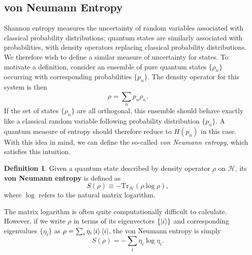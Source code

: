 \documentclass[12pt,a4paper]{report}
\numberwithin{equation}{section}
\newcommand{\ketbra}[2]{\ket{#1}\bra{#2}}
\newcommand{\ketbras}[1]{\ketbra{#1}{#1}}
\newcommand{\tr}{\text{Tr}}
\theoremstyle{definition}
\newtheorem{definition}{Definition}[section]
\theoremstyle{theorem}
\theoremstyle{theorem}
\theoremstyle{example}
\theoremstyle{definition}
\begin{document}
\subsection{von Neumann Entropy}
Shannon entropy measures the uncertainty of random variables associated with classical probability distributions; quantum states are similarly associated with probabilities, with density operators replacing classical probability distributions. We therefore wish to define a similar measure of uncertainty for states. To motivate a definition, consider an ensemble of pure quantum states $\{\rho_{n}\}$ occurring with corresponding probabilities $\{p_n\}$. The density operator for this system is then
\begin{equation}
	\rho=\sum_{n}p_{n}\rho_{n}.
\end{equation}
If the set of states $\{\rho_{n}\}$ are all orthogonal, this ensemble should behave exactly like a classical random variable following probability distribution $\{p_{n}\}$. A quantum measure of entropy should therefore reduce to $H(p_{n})$ in this case. With this idea in mind, we can define the so-called \textit{von Neumann entropy}, which satisfies this intuition.
\begin{definition}
	Given a quantum state described by density operator $\rho$ on $\mathcal{H}$, its \textbf{von Neumann entropy} is defined as
	\begin{equation}
		S(\rho)\equiv -\tr_{\mathcal{H}}\left(\rho\log{\rho}\right),
	\end{equation}
	where $\log$ refers to the natural matrix logarithm.
\end{definition}
The matrix logarithm is often quite computationally difficult to calculate. However, if we write $\rho$ in terms of its eigenvectors $\{\ket{i}\}$ and corresponding eigenvalues $\{\eta_{i}\}$ as $\rho=\sum_{i}\eta_{i}\ketbras{i}$, the von Neumann entropy is simply
\begin{equation}
	S(\rho)=-\sum_{i}\eta_{i}\log\eta_{i}.
\end{equation}
\end{document}
